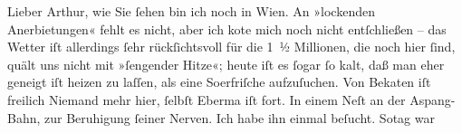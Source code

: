 \pstart
           Lieber Arthur, wie Sie{ }ſehen bin ich noch in Wien. An »lockenden Anerbietungen« fehlt es nicht, aber ich ko{\geminationn}te mich noch nicht entſchließen – das Wetter iſt
               allerdings{ }ſehr rückſichtsvoll für die 1 ½ Millionen, die noch hier{ }ſind, quält
               uns nicht mit »ſengender Hitze«; heute iſt es{ }ſogar{ }ſo kalt, daß man eher geneigt iſt
               heizen zu laſſen, als eine So{\geminationm}erfriſche aufzuſuchen. Von
                  Beka{\geminationn}ten iſt freilich Niemand mehr hier,{ }ſelbſt Eberma{\geminationn} iſt fort. In einem Neſt an der Aspang-Bahn, zur Beruhigung{ }ſeiner Nerven. Ich habe ihn einmal beſucht. So{\geminationn}tag war
